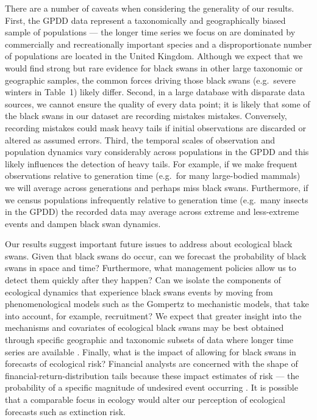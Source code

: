 There are a number of caveats when considering the generality of our results.
First, the GPDD data represent a taxonomically and geographically biased sample
of populations --- the longer time series we focus on are dominated by
commercially and recreationally important species and a disproportionate number
of populations are located in the United Kingdom. Although we expect that we
would find strong but rare evidence for black swans in other large taxonomic or
geographic samples, the common forces driving those black swans (e.g.~severe
winters in Table~1) likely differ. Second, in a large database with disparate
data sources, we cannot ensure the quality of every data point;
it is likely that some of the black swans in our dataset are 
recording mistakes mistakes.
Conversely, recording mistakes could mask heavy tails if initial observations are discarded or altered as assumed errors. Third, the temporal scales
of observation and population dynamics vary considerably across populations in
the GPDD and this likely influences the detection of heavy tails. For example,
if we make frequent observations relative to generation time (e.g.~for many
large-bodied mammals) we will average across generations and perhaps miss
black swans. Furthermore, if we census populations infrequently relative to
generation time (e.g.~many insects in the GPDD) the recorded data may average
across extreme and less-extreme events and dampen black swan dynamics.

Our results suggest important future issues to address about ecological black
swans. Given that black swans do occur, can we forecast the probability of
black swans in space and time? Furthermore, what management policies allow us
to detect them quickly after they happen? Can we isolate the
components of ecological dynamics that experience black swans events by moving
from phenomenological models such as the Gompertz to mechanistic models, that
take into account, for example, recruitment? We expect that greater insight
into the mechanisms and covariates of ecological black swans may be best
obtained through specific geographic and taxonomic subsets of data where longer
time series are available \citep[e.g.][]{segura2013}. Finally, what is the
impact of allowing for black swans in forecasts of ecological risk? Financial
analysts are concerned with the shape of financial-return-distribution tails
because these impact estimates of risk --- the probability of a specific
magnitude of undesired event occurring \citep{rachev2008}. It is possible that
a comparable focus in ecology would alter our perception of ecological
forecasts such as extinction risk.

